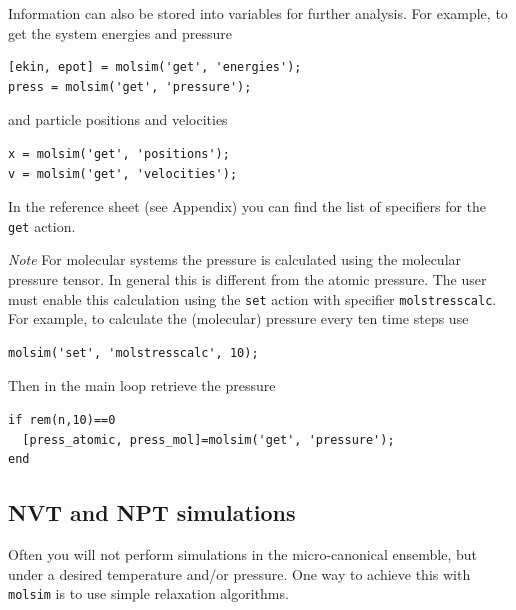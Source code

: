 \documentclass[11pt]{article}
\begin{document}
Information can also be stored into variables for further analysis. For example,
to get the system energies and pressure
\begin{verbatim}
[ekin, epot] = molsim('get', 'energies');
press = molsim('get', 'pressure');
\end{verbatim}
and particle positions and velocities
\begin{verbatim}
x = molsim('get', 'positions');
v = molsim('get', 'velocities');
\end{verbatim}
In the reference sheet (see Appendix) you can find the list of specifiers for the \verb!get! action.


\textit{Note} For molecular systems the pressure is
calculated using the molecular pressure tensor. In general this is different
from the atomic pressure. The user must enable this calculation using the
\verb!set! action with specifier \verb!molstresscalc!. For example, to
calculate the (molecular) pressure every ten time steps use
\begin{verbatim}
molsim('set', 'molstresscalc', 10);
\end{verbatim}
Then in the main loop retrieve the pressure
\begin{verbatim}
if rem(n,10)==0
  [press_atomic, press_mol]=molsim('get', 'pressure');
end
\end{verbatim}

\subsection{NVT and NPT simulations}
Often you will not perform simulations in the micro-canonical ensemble, but
under a desired temperature and/or pressure. One way to achieve this with
\verb!molsim! is to use simple relaxation algorithms. 
\end{document}
